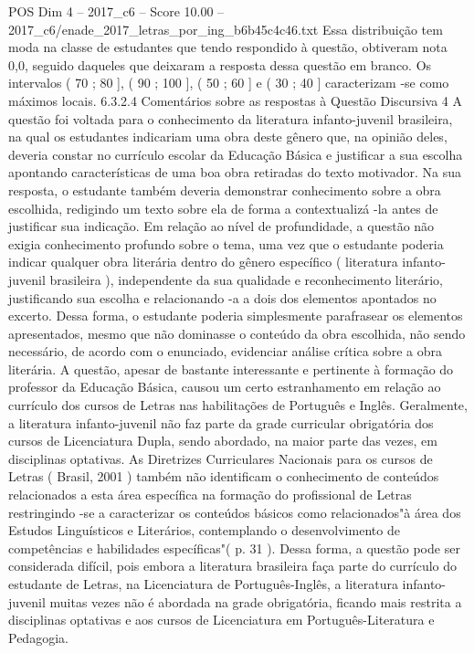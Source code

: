 \begin{textsample}{POS Dim 4 – 2017\_c6 – Score 10.00 – 2017\_c6/enade\_2017\_letras\_por\_ing\_b6b45c4c46.txt}
Essa distribuição tem moda na classe de estudantes que tendo respondido à questão, obtiveram nota 0,0, seguido daqueles que deixaram a resposta dessa questão em branco.
Os intervalos ( 70 ; 80 ], ( 90 ; 100 ], ( 50 ; 60 ] e ( 30 ; 40 ] caracterizam -se como máximos locais. 6.3.2.4 Comentários sobre as respostas à Questão Discursiva 4 A questão foi voltada para o conhecimento da literatura infanto-juvenil brasileira, na qual os estudantes indicariam uma obra deste gênero que, na opinião deles, deveria constar no currículo escolar da Educação Básica e justificar a sua escolha apontando características de uma boa obra retiradas do texto motivador.
Na sua resposta, o estudante também deveria demonstrar conhecimento sobre a obra escolhida, redigindo um texto sobre ela de forma a contextualizá -la antes de justificar sua indicação.
Em relação ao nível de profundidade, a questão não exigia conhecimento profundo sobre o tema, uma vez que o estudante poderia indicar qualquer obra literária dentro do gênero específico ( literatura infanto-juvenil brasileira ), independente da sua qualidade e reconhecimento literário, justificando sua escolha e relacionando -a a dois dos elementos apontados no excerto.
Dessa forma, o estudante poderia simplesmente parafrasear os elementos apresentados, mesmo que não dominasse o conteúdo da obra escolhida, não sendo necessário, de acordo com o enunciado, evidenciar análise crítica sobre a obra literária.
A questão, apesar de bastante interessante e pertinente à formação do professor da Educação Básica, causou um certo estranhamento em relação ao currículo dos cursos de Letras nas habilitações de Português e Inglês.
Geralmente, a literatura infanto-juvenil não faz parte da grade curricular obrigatória dos cursos de Licenciatura Dupla, sendo abordado, na maior parte das vezes, em disciplinas optativas.
As Diretrizes Curriculares Nacionais para os cursos de Letras ( Brasil, 2001 ) também não identificam o conhecimento de conteúdos relacionados a esta área específica na formação do profissional de Letras restringindo -se a caracterizar os conteúdos básicos como relacionados"à área dos Estudos Linguísticos e Literários, contemplando o desenvolvimento de competências e habilidades específicas"( p. 31 ).
Dessa forma, a questão pode ser considerada difícil, pois embora a literatura brasileira faça parte do currículo do estudante de Letras, na Licenciatura de Português-Inglês, a literatura infanto-juvenil muitas vezes não é abordada na grade obrigatória, ficando mais restrita a disciplinas optativas e aos cursos de Licenciatura em Português-Literatura e Pedagogia.

\end{textsample}
